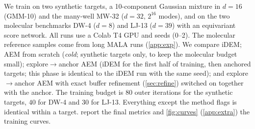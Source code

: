 We train on two synthetic targets, a 10-component Gaussian mixture in $d=16$ (GMM-10) and the many-well MW-32 ($d=32$, $2^{16}$ modes), and on the two molecular benchmarks DW-4 ($d=8$) and LJ-13 ($d=39$) with an equivariant score network. All runs use a Colab T4 GPU and  seeds (0--2). The molecular reference samples come from long MALA runs (\cref{app:exp}).
We compare iDEM; AEM from scratch (\emph{cold}; synthetic targets only, to keep the molecular budget small); explore$\to$anchor AEM (iDEM for the first half of training, then anchored targets; this phase is identical to the iDEM run with the same seed); and explore$\to$anchor AEM with exact buffer refinement (\cref{sec:refine}) switched on together with the anchor. The training budget is $80$ outer iterations for the synthetic targets, $40$ for DW-4 and $30$ for LJ-13. Everything except the method flags is identical within a target.
 report the final metrics and \cref{fig:curves} (\cref{app:extra}) the training curves.

